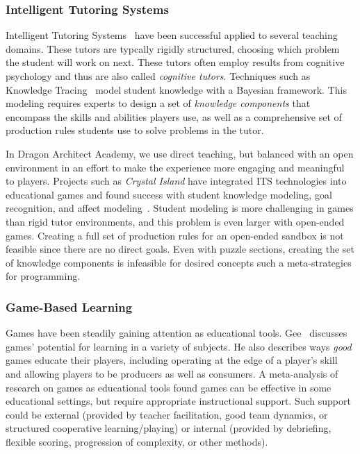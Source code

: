 \documentclass{sig-alternate}
\newcommand{\gametitle}{{\color{RoyalPurple} Dragon Architect Academy}}
\begin{document}
\subsubsection{Intelligent Tutoring Systems}
Intelligent Tutoring Systems~\cite{koedinger06cognitive} have been successful applied to several teaching domains.
These tutors are typcally rigidly structured, choosing which problem the student will work on next.
These tutors often employ results from cognitive psychology and thus are also called \emph{cognitive tutors}.
Techniques such as Knowledge Tracing~\cite{corbett1994knowledge} model student knowledge with a Bayesian framework.
This modeling requires experts to design a set of \emph{knowledge components} that encompass the skills and abilities players use, as well as a comprehensive set of production rules students use to solve problems in the tutor.

In \gametitle{}, we use direct teaching, but balanced with an open environment in an effort to make the experience more engaging and meaningful to players.
Projects such as \emph{Crystal Island} have integrated ITS technologies into educational games and found success with student knowledge modeling, goal recognition, and affect modeling~\cite{lester2013serious,rowe2010modeling}.
Student modeling is more challenging in games than rigid tutor environments, and this problem is even larger with open-ended games.
Creating a full set of production rules for an open-ended sandbox is not feasible since there are no direct goals.
Even with puzzle sections, creating the set of knowledge components is infeasible for desired concepts such a meta-strategies for programming.

\subsubsection{Game-Based Learning}
Games have been steadily gaining attention as educational tools. 
Gee~\cite{gee2003video} discusses games' potential for learning in a variety of subjects. 
He also describes ways \emph{good} games educate their players, including operating at the edge of a player's skill and allowing players to be producers as well as consumers. 
A meta-analysis of research on games as educational tools \cite{ke2009qualitative} found games can be effective in some educational settings, but require appropriate instructional support.
Such support could be external (provided by teacher facilitation, good team dynamics, or structured cooperative learning/playing) or internal (provided by debriefing, flexible scoring, progression of complexity, or other methods).
\end{document}
